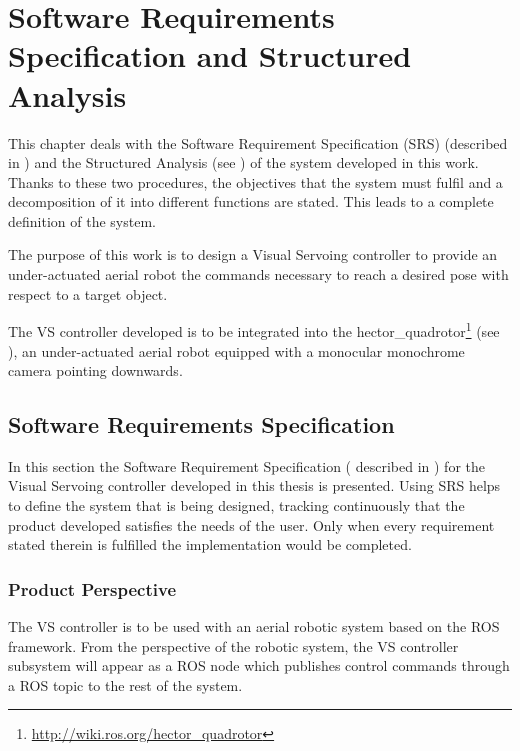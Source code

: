 
\chapter{Software Requirements Specification and Structured Analysis}
\label{chap:srs-sa}

This chapter deals with the Software Requirement Specification (SRS) (described in \cite{IEEE8301998}) and the Structured Analysis (see \cite{SA_Braune}) of the system developed in this work. Thanks to these two procedures, the objectives that the system must fulfil and a decomposition of it into different functions are stated. This leads to a complete definition of the system.


The purpose of this work is to design a Visual Servoing controller to provide an under-actuated aerial robot the commands necessary to reach a desired pose with respect to a target object.

The VS controller developed is to be integrated into the hector\_quadrotor\footnote{\url{http://wiki.ros.org/hector_quadrotor}} (see \cite{2012simpar_meyer}), an under-actuated aerial robot equipped with a monocular monochrome camera pointing downwards.

\section{Software Requirements Specification}
\label{sec:srs}

In this section the Software Requirement Specification ( described in \cite{IEEE8301998}) for the Visual Servoing controller developed in this thesis is presented. Using SRS helps to define the system that is being designed, tracking continuously that the product developed satisfies the needs of the user. Only when every requirement stated therein is fulfilled the implementation would be completed.

\subsection{Product Perspective}
\label{sec:product-perspective}

The VS controller is to be used with an aerial robotic system based on the ROS framework. From the perspective of the robotic system, the VS controller subsystem will appear as a ROS node which publishes control commands through a ROS topic to the rest of the system.

